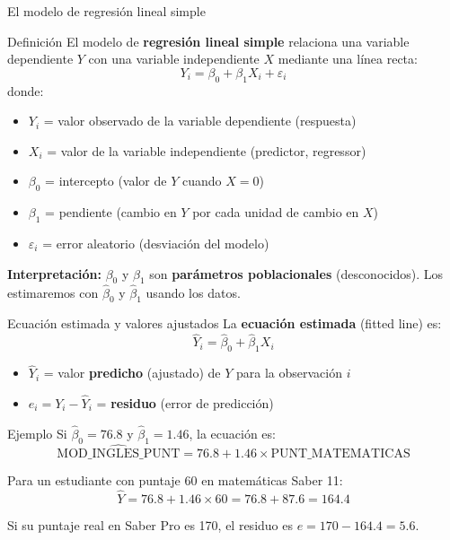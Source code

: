 \documentclass[aspectratio=169, 11pt]{beamer}
\begin{document}
\begin{frame}{El modelo de regresión lineal simple}
\begin{block}{Definición}
El modelo de \textbf{regresión lineal simple} relaciona una variable dependiente $Y$ con una variable independiente $X$ mediante una línea recta:
\[
Y_i = \beta_0 + \beta_1 X_i + \varepsilon_i
\]
donde:
\begin{itemize}
  \item $Y_i$ = valor observado de la variable dependiente (respuesta)
  \item $X_i$ = valor de la variable independiente (predictor, regressor)
  \item $\beta_0$ = intercepto (valor de $Y$ cuando $X = 0$)
  \item $\beta_1$ = pendiente (cambio en $Y$ por cada unidad de cambio en $X$)
  \item $\varepsilon_i$ = error aleatorio (desviación del modelo)
\end{itemize}
\end{block}
\vspace{-2pt}
{\small \textbf{Interpretación:} $\beta_0$ y $\beta_1$ son \textbf{parámetros poblacionales} (desconocidos). Los estimaremos con $\hat{\beta}_0$ y $\hat{\beta}_1$ usando los datos.}
\end{frame}

\begin{frame}{Ecuación estimada y valores ajustados}
La \textbf{ecuación estimada} (fitted line) es:
\[
\hat{Y}_i = \hat{\beta}_0 + \hat{\beta}_1 X_i
\]

\vspace{0.1cm}
\begin{itemize}
  \item $\hat{Y}_i$ = valor \textbf{predicho} (ajustado) de $Y$ para la observación $i$
  \item $e_i = Y_i - \hat{Y}_i$ = \textbf{residuo} (error de predicción)
\end{itemize}

\vspace{0.1cm}
\begin{exampleblock}{Ejemplo}
Si $\hat{\beta}_0 = 76.8$ y $\hat{\beta}_1 = 1.46$, la ecuación es:
\[
\widehat{\text{MOD\_INGLES\_PUNT}} = 76.8 + 1.46 \times \text{PUNT\_MATEMATICAS}
\]

Para un estudiante con puntaje 60 en matemáticas Saber 11:
\[
\hat{Y} = 76.8 + 1.46 \times 60 = 76.8 + 87.6 = 164.4
\]

Si su puntaje real en Saber Pro es 170, el residuo es $e = 170 - 164.4 = 5.6$.
\end{exampleblock}
\end{frame}
\end{document}
